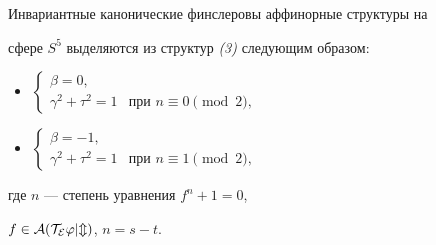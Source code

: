 \begin{thm} Инвариантные канонические финслеровы аффинорные структуры на 


сфере $S^5$ выделяются из структур {\em (3)} следующим образом: 


\begin{itemize} 


\item[1)] $\displaystyle 


\begin{cases} 


\beta=0,\\ 


\gamma^2+\tau^2=1&\text{при }n\equiv0\pmod{2}, 


\end{cases} 


$ 


\item[2)] $\displaystyle 


\begin{cases} 


\beta=-1,\\ 


\gamma^2+\tau^2=1&\text{при }n\equiv1\pmod{2}, 


\end{cases} 


$ 


\end{itemize} 


где $n$ --- степень уравнения $f^n+1=0$, 


$f\in\cal A(T_E\varphi|m)$, $n=s-t$. 


\end{thm} 


 


